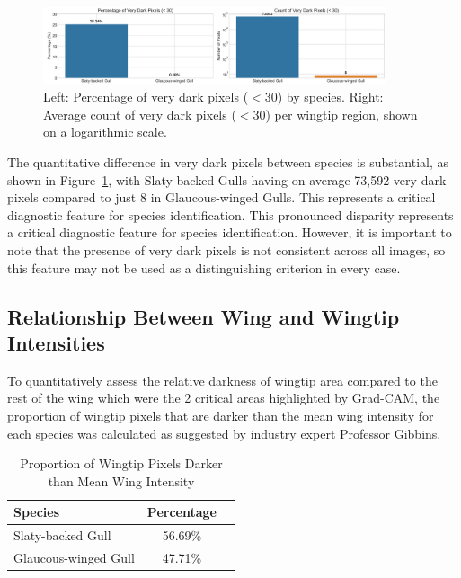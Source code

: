 \documentclass[a4paper,12pt]{report}
\begin{document}
\begin{figure}[H]
    \centering
    \includegraphics[width=0.9\textwidth]{images/REPORT_IMAGES_INTENSITY/I2/darkpixels.png}
    \caption{Left: Percentage of very dark pixels ($<$30) by species. Right: Average count of very dark pixels ($<$30) per wingtip region, shown on a logarithmic scale.}
    \label{fig:darkpixels}
\end{figure}

The quantitative difference in very dark pixels between species is substantial, as shown in Figure~\ref{fig:darkpixels}, with Slaty-backed Gulls having on average 73,592 very dark pixels compared to just 8 in Glaucous-winged Gulls. This represents a critical diagnostic feature for species identification. This pronounced disparity represents a critical diagnostic feature for species identification. However, it is important to note that the presence of very dark pixels is not consistent across all images, so this feature may not be used as a distinguishing criterion in every case.

\subsection{Relationship Between Wing and Wingtip Intensities}

To quantitatively assess the relative darkness of wingtip area compared to the rest of the wing which were the 2 critical areas highlighted by Grad-CAM, the proportion of wingtip pixels that are darker than the mean wing intensity for each species was calculated as suggested by industry expert Professor Gibbins.


\begin{table}[H]
    \centering
    \caption{Proportion of Wingtip Pixels Darker than Mean Wing Intensity}
    \label{tab:darknessproportion}
    \begin{tabular}{lcc}
        \toprule
        Species & Percentage \\
        \midrule
        Slaty-backed Gull & 56.69\% \\
        Glaucous-winged Gull & 47.71\% \\
        \bottomrule
    \end{tabular}
\end{table}
\end{document}
